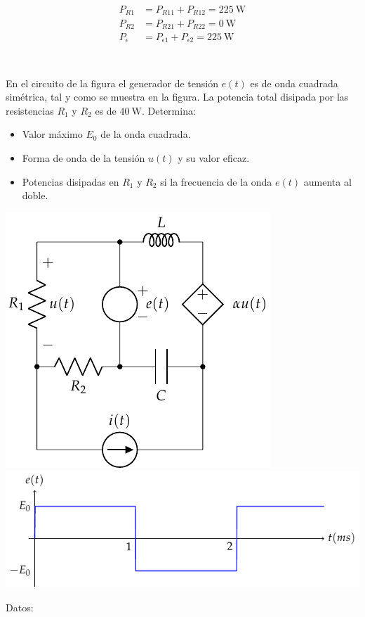 \documentclass[12pt]{article}
\begin{document}
\begin{align*}
  P_{R1} &= P_{R11} + P_{R12} = \SI{225}{\watt}\\
  P_{R2} &= P_{R21} + P_{R22} = \SI{0}{\watt}\\
  P_{\epsilon} &= P_{\epsilon1} + P_{\epsilon2} = \SI{225}{\watt}\\
\end{align*}

\clearpage

\section{}

En el circuito de la figura el generador de tensión $e(t)$ es de onda cuadrada simétrica, tal y como se muestra en la figura. La potencia total disipada por las resistencias $R_1$ y $R_2$ es de $\SI{40}{\watt}$.
Determina:

\begin{itemize}
  \item Valor máximo $E_0$ de la onda cuadrada.
  \item Forma de onda de la tensión $u(t)$ y su valor eficaz.
  \item Potencias disipadas en $R_1$ y $R_2$ si la frecuencia de la onda $e(t)$ aumenta al doble.
\end{itemize}

\begin{center}
  \includegraphics{../figs/superposicion3}
  \includegraphics{../figs/superposicionOndaCuadrada}
\end{center}
Datos:
\end{document}
